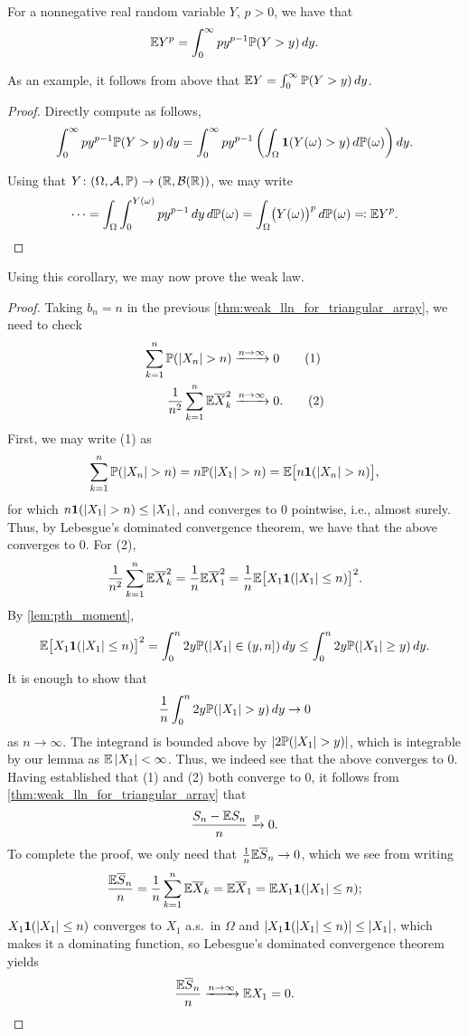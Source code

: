 \begin{lemma} \label{lem:pth_moment}
    For a nonnegative real random variable $Y$, $p > 0$, we have that
    \[ \mathbb E Y^p = \int_0^\infty p y^{p-1} \mathbb P(Y > y) \, dy. \]
\end{lemma} \vspace{-8pt}
As an example, it follows from above that $\mathbb E Y = \int_0^\infty \mathbb P(Y > y) \, dy$.
\begin{proof}
    Directly compute as follows,
    \[ \int_0^\infty p y^{p-1} \mathbb P(Y > y) \, dy = \int_0^\infty p y^{p-1} \left(\int_\Omega \mathbf 1(Y(\omega) > y) \, d\mathbb P(\omega)\right) dy. \]

    \newpage
    Using that $Y \colon (\Omega, \mathcal A, \mathbb P) \to (\mathbb R, \mathcal B(\mathbb R))$, we may write
    \[ \dots = \int_\Omega \int_0^{Y(\omega)} p y^{p-1} \, dy \, d\mathbb P(\omega) = \int_\Omega \bigl(Y(\omega)\bigr)^p \, d\mathbb P(\omega) \eqcolon \mathbb E Y^p. \qedhere \]
\end{proof}

Using this corollary, we may now prove the weak law.
\begin{proof}
    Taking $b_n = n$ in the previous \ref{thm:weak_lln_for_triangular_array}, we need to check
    \begin{align*}
        \sum_{k=1}^n \mathbb P(\left\lvert X_n \right\rvert > n) &\xrightarrow{n \to \infty} 0 \tag{1} \\
        \frac{1}{n^2} \sum_{k=1}^n \mathbb E \overline X_k ^2 &\xrightarrow{n \to \infty} 0. \tag{2}
    \end{align*}
    First, we may write (1) as
    \[ \sum_{k=1}^n \mathbb P(\left\lvert X_n \right\rvert > n) = n \mathbb P(\left\lvert X_1 \right\rvert > n) = \mathbb E\bigl[ n \mathbf 1 (\left\lvert X_n \right\rvert > n) \bigr], \]
    for which $n \mathbf 1(\left\lvert X_1 \right\rvert > n) \leq \left\lvert X_1 \right\rvert$, and converges to $0$ pointwise, i.e., almost surely. Thus, by Lebesgue's dominated convergence theorem, we have that the above converges to $0$. For (2),
    \[ \frac{1}{n^2} \sum_{k=1}^n \mathbb E \overline X_k^2 = \frac{1}{n} \mathbb E \overline X_1^2 = \frac{1}{n} \mathbb E\bigl[X_1 \mathbf 1(\left\lvert X_1 \right\rvert \leq n)\bigr]^2. \]
    By \ref{lem:pth_moment},
    \[ \mathbb E\bigl[X_1 \mathbf 1(\left\lvert X_1 \right\rvert \leq n)\bigr]^2 = \int_0^n 2y \mathbb P(\left\lvert X_1 \right\rvert \in (y, n]) \, dy \leq \int_0^n 2y \mathbb P(\left\lvert X_1 \right\rvert \geq y) \, dy. \]
    It is enough to show that
    \[ \frac{1}{n} \int_0^n 2y \mathbb P(\left\lvert X_1 \right\rvert > y) \, dy \to 0 \]
    as $n \to \infty$. The integrand is bounded above by $\left\lvert 2 \mathbb P(\left\lvert X_1 \right\rvert > y) \right\rvert$, which is integrable by our lemma as $\mathbb E \left\lvert X_1 \right\rvert < \infty$. Thus, we indeed see that the above converges to $0$. Having established that (1) and (2) both converge to $0$, it follows from \ref{thm:weak_lln_for_triangular_array} that
    \[ \frac{S_n - \mathbb E S_n}{n} \xrightarrow{\mathbb P} 0. \]
    To complete the proof, we only need that $\frac{1}{n} \mathbb E \overline S_n \to 0$, which we see from writing
    \[ \frac{\mathbb E \overline S_n}{n} = \frac{1}{n} \sum_{k=1}^n \mathbb E \overline X_k = \mathbb E \overline X_1 = \mathbb E X_1 \mathbf 1(\left\lvert X_1 \right\rvert \leq n); \]
    $X_1 \mathbf 1(\left\lvert X_1 \right\rvert \leq n)$ converges to $X_1$ a.s.\ in $\Omega$ and $\left\lvert X_1 \mathbf 1(\left\lvert X_1 \right\rvert \leq n) \right\rvert \leq \left\lvert X_1 \right\rvert$, which makes it a dominating function, so Lebesgue's dominated convergence theorem yields
    \[ \frac{\mathbb E \overline S_n}{n} \xrightarrow{n \to \infty} \mathbb E X_1 = 0. \qedhere \]
\end{proof}